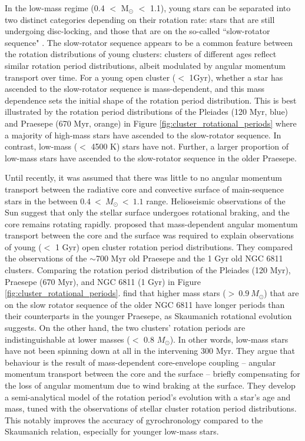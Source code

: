 In the low-mass regime (0.4 $<$ M$_{\odot}$ $<$ 1.1), young stars can be separated into two distinct categories depending on their rotation rate: stars that are still undergoing disc-locking, and those that are on the so-called ``slow-rotator sequence" \citep[see, e.g.,][]{lanzafame_rotational_2015}.
The slow-rotator sequence appears to be a common feature between the rotation distributions of young clusters: clusters of different ages reflect similar rotation period distributions, albeit modulated by angular momentum transport over time.
For a young open cluster ($<$ 1Gyr), whether a star has ascended to the slow-rotator sequence is mass-dependent, and this mass dependence sets the initial shape of the rotation period distribution.
This is best illustrated by the rotation period distributions of the Pleiades (120 Myr, blue) and Praesepe (670 Myr, orange) in Figure \ref{fig:cluster_rotational_periods} where a majority of high-mass stars have ascended to the slow-rotator sequence.
In contrast, low-mass ($<$ 4500 K) stars have not.
Further, a larger proportion of low-mass stars have ascended to the slow-rotator sequence in the older Praesepe.

Until recently, it was assumed that there was little to no angular momentum transport between the radiative core and convective surface of main-sequence stars in the between $0.4 \ < \ M_{\odot} \ < \ 1.1$ range. 
Helioseismic observations of the Sun suggest that only the stellar surface undergoes rotational braking, and the core remains rotating rapidly.
\citet{spada_competing_2020} proposed that mass-dependent angular momentum transport between the core and the surface was required to explain observations of young ($<$ 1 Gyr) open cluster rotation period distributions.
They compared the observations of the $\sim$700 Myr old Praesepe and the 1 Gyr old NGC 6811 clusters.
Comparing the rotation period distribution of the Pleiades (120 Myr), Praesepe (670 Myr), and NGC 6811 (1 Gyr) in Figure \ref{fig:cluster_rotational_periods}. \citet{spada_competing_2020} find that higher mass stars (${>\ 0.9 \ M_{\odot}}$) that are on the slow rotator sequence of the older NGC 6811 have longer periods than their counterparts in the younger Praesepe, as Skaumanich rotational evolution suggests.
On the other hand, the two clusters' rotation periods are indistinguishable at lower masses ($<$ 0.8 $M_{\odot}$).
In other words, low-mass stars have not been spinning down at all in the intervening 300 Myr. 
They argue that behaviour is the result of mass-dependent core-envelope coupling -- angular momentum transport between the core and the surface -- briefly compensating for the loss of angular momentum due to wind braking at the surface.
They develop a semi-analytical model of the rotation period's evolution with a star's age and mass, tuned with the observations of stellar cluster rotation period distributions.
This notably improves the accuracy of gyrochronology compared to the Skaumanich relation, especially for younger low-mass stars.

